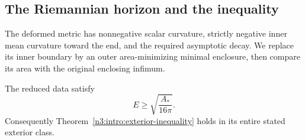 \subsection{The Riemannian horizon and the inequality}

The deformed metric has nonnegative scalar curvature, strictly negative
inner mean curvature toward the end, and the required asymptotic decay.
We replace its inner boundary by an outer area-minimizing minimal
enclosure, then compare its area with the original enclosing infimum.

\begin{theorem}\label{n3:limit:energy}
The reduced data satisfy
\[
                              E\ge\sqrt{\frac{A_*}{16\pi}}.
\]
Consequently Theorem~\ref{n3:intro:exterior-inequality} holds in its
entire stated exterior class.
\end{theorem}

